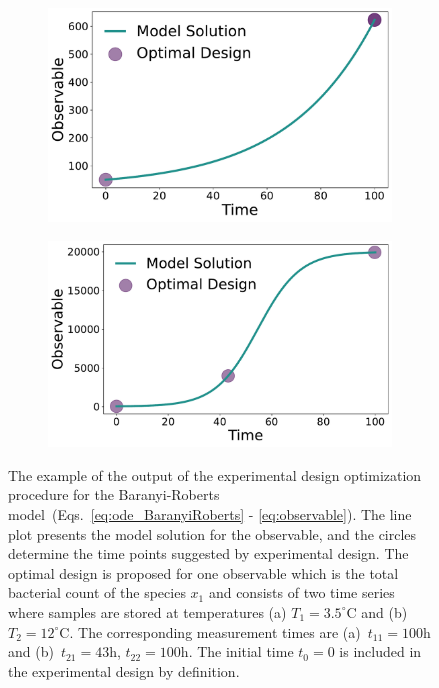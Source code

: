 \documentclass[graybox]{svmult}
\begin{document}
\begin{figure}[H]
    \begin{subfigure}{.5\textwidth}
        \centering
        \includegraphics[scale=0.255]{Figures/Fig3a.pdf}
    \end{subfigure}
    \begin{subfigure}{.5\textwidth}
        \centering
        \includegraphics[scale=0.255]{Figures/Fig3b.pdf}
    \end{subfigure}
    \caption{The example of the output of the experimental design optimization procedure for the Baranyi-Roberts model~(Eqs.~\ref{eq:ode_BaranyiRoberts} - \ref{eq:observable}).
    The line plot presents the model solution for the observable, and the circles determine the time points suggested by experimental design.
    The optimal design is proposed for one observable which is the total bacterial count of the species $x_1$ and consists of two time series where samples are stored at temperatures (a) $T_1 = 3.5^\circ$C and (b) $T_2 = 12^\circ$C.
    The corresponding measurement times are (a)~$t_{11}=100$h and (b)~$t_{21}=43$h, $t_{22}=100$h.
    The initial time $t_0=0$ is included in the experimental design by definition.}
    \label{Fig3}
\end{figure}
\end{document}
